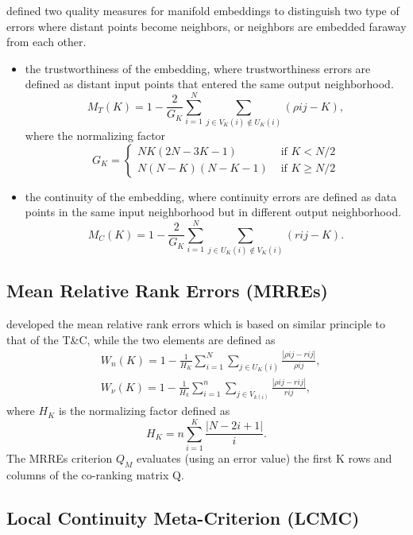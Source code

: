 \documentclass[11pt,a4paper,]{article}
\begin{document}
\textcite{Venna2006-nd} defined two quality measures for manifold embeddings to distinguish two type of errors where distant points become neighbors, or neighbors are embedded faraway from each other.

\begin{itemize}
\item
  the trustworthiness of the embedding, where trustworthiness errors are defined as distant input points that entered the same output neighborhood.
  \[M_{T}(K)=1-\frac{2}{G_{K}} \sum_{i=1}^{N} \sum_{j \in V_{K}(i) \notin U_{K}(i)}(\rho{ij}-K),\]
  where the normalizing factor
  \[
  G_{K}=\left\{\begin{array}{ll}
  N K(2 N-3 K-1) & \text { if } K<N / 2 \\
  N(N-K)(N-K-1) & \text { if } K \geqslant N / 2
  \end{array}\right.
  \]
\item
  the continuity of the embedding, where continuity errors are defined as data points in the same input neighborhood but in different output neighborhood.
  \[M_{C}(K)=1-\frac{2}{G_{K}} \sum_{i=1}^{N} \sum_{j \in U_{K}(i) \notin V_{K}(i)}(r{ij}-K).\]
\end{itemize}

\hypertarget{mean-relative-rank-errors-mrres}{%
\subsection{Mean Relative Rank Errors (MRREs)}\label{mean-relative-rank-errors-mrres}}

\textcite{Lee2008-cx} developed the mean relative rank errors which is based on similar principle to that of the T\&C, while the two elements are defined as
\[
\begin{aligned}
&W_{n}(K)=1-\frac{1}{H_{K}} \sum_{i=1}^{N} \sum_{j \in U_{K}(i)} \frac{|\rho{ij}-r{ij}|}{\rho{ij}}, \\
&W_{\nu}(K)=1-\frac{1}{H_{k}} \sum_{i=1}^{n} \sum_{j \in V_{k(i)}} \frac{|\rho{ij}-r{ij}|}{r{ij}},
\end{aligned}
\]
where \(H_K\) is the normalizing factor defined as
\[
H_{K}=n \sum_{i=1}^{K} \frac{|N-2 i+1|}{i}.
\]
The MRREs criterion \(Q_M\) evaluates (using an error value) the first K rows and columns of the co-ranking matrix \(\mathrm{Q}\).

\hypertarget{local-continuity-meta-criterion-lcmc}{%
\subsection{Local Continuity Meta-Criterion (LCMC)}\label{local-continuity-meta-criterion-lcmc}}
\end{document}

